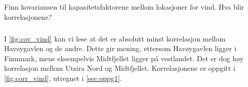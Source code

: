 \documentclass{article}
\begin{document}
\newpage
\subsection{}
Finn kovariansen til kapasitetsfaktorene mellom lokasjoner for vind. Hva blir korrelasjonene?

\subsubsection{}
I \autoref{fig:cov_vind} kan vi lese at det er absolutt minst korrelasjon mellom Havøygavlen og de andre.
Dette gir mening, ettersom Havøygavlen ligger i Finnmark, mens eksempelvis Midtfjellet ligger på vestlandet. Det er dog høy korrelasjon mellom Utsira Nord og Midtfjellet.
Korrelasjonene er oppgitt i \autoref{fig:corr_vind}, utregnet i \autoref{sec:oppg1}.
\end{document}
